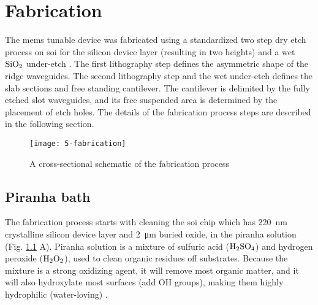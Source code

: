 \documentclass[../report.tex]{subfiles}
\begin{document}
	
	
\chapter{Fabrication}\label{sec:fab_process}

The \gls{mems} tunable device was fabricated using a standardized two step dry etch process on \gls{soi} for the silicon device layer (resulting in two heights) and a wet $\mathrm{SiO_2}$ under-etch \cite{errando-herranz_low-power_2015}. The first lithography step defines the asymmetric shape of the ridge waveguides. The second lithography step and the wet under-etch defines the slab sections and free standing cantilever. The cantilever is delimited by the fully etched slot waveguides, and its free suspended area is determined by the placement of etch holes. The details of the fabrication process steps are described in the following section.

\begin{figure}[h] %
	\centering
	\texttt{[image: 5-fabrication]}
	\caption{A cross-sectional schematic of the fabrication process}
	\label{fig:5_fabrication}
\end{figure}


\section{Piranha bath}			
The fabrication process starts with cleaning the \gls{soi} chip which has \SI{220}{\nano \meter} crystalline silicon device layer and \SI{2}{\micro \meter} buried oxide, in the piranha solution (Fig. \ref{fig:5_fabrication} A). Piranha solution is a mixture of sulfuric acid ($\mathrm{H_2SO_4}$) and hydrogen peroxide ($\mathrm{H_2O_2}$), used to clean organic residues off substrates. Because the mixture is a strong oxidizing agent, it will remove most organic matter, and it will also hydroxylate most surfaces (add OH groups), making them highly hydrophilic (water-loving) \cite{piranha_bath}. 
 
\end{document}
